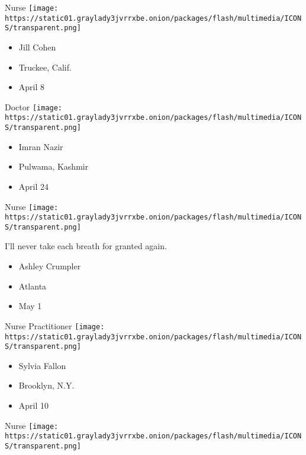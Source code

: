 \protect\hyperlink{item-jill-cohen}{}

Nurse
\texttt{[image: https://static01.graylady3jvrrxbe.onion/packages/flash/multimedia/ICONS/transparent.png]}

\begin{itemize}
\tightlist
\item
  Jill Cohen
\item
  Truckee, Calif.
\item
  April 8
\end{itemize}

\protect\hyperlink{item-imran-nazir}{}

Doctor
\texttt{[image: https://static01.graylady3jvrrxbe.onion/packages/flash/multimedia/ICONS/transparent.png]}

\begin{itemize}
\tightlist
\item
  Imran Nazir
\item
  Pulwama, Kashmir
\item
  April 24
\end{itemize}

\protect\hyperlink{item-ashley-crumpler}{}

Nurse
\texttt{[image: https://static01.graylady3jvrrxbe.onion/packages/flash/multimedia/ICONS/transparent.png]}

I'll never take each breath for granted again.

\begin{itemize}
\tightlist
\item
  Ashley Crumpler
\item
  Atlanta
\item
  May 1
\end{itemize}

\protect\hyperlink{item-sylvia-fallon}{}

Nurse Practitioner
\texttt{[image: https://static01.graylady3jvrrxbe.onion/packages/flash/multimedia/ICONS/transparent.png]}

\begin{itemize}
\tightlist
\item
  Sylvia Fallon
\item
  Brooklyn, N.Y.
\item
  April 10
\end{itemize}

\protect\hyperlink{item-shivyon-mitchell}{}

Nurse
\texttt{[image: https://static01.graylady3jvrrxbe.onion/packages/flash/multimedia/ICONS/transparent.png]}

